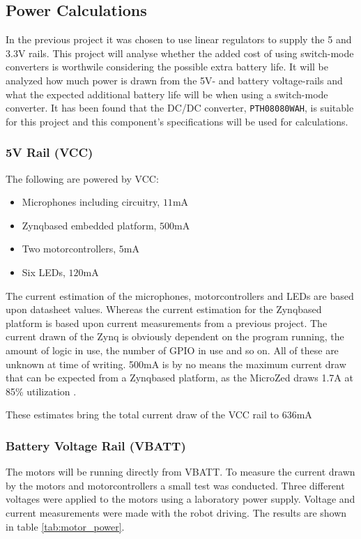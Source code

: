 \subsection{Power Calculations} %
\label{sub:power_calculations}
In the previous project it was chosen to use linear regulators to supply the 5 and 3.3V rails.
This project will analyse whether the added cost of using switch-mode converters is worthwile considering the possible extra battery life.
It will be analyzed how much power is drawn from the 5V- and battery voltage-rails and what the expected additional battery life will be when using a switch-mode converter.
It has been found that the DC/DC converter, \texttt{PTH08080WAH}, is suitable for this project and this component's specifications will be used for calculations. 

\subsubsection*{5V Rail (VCC)} %

The following are powered by VCC:
\begin{itemize}
	\item Microphones including circuitry, $11$mA
	\item Zynqbased embedded platform, $500$mA
	\item Two motorcontrollers, $5$mA
	\item Six LEDs, $120$mA
\end{itemize}
The current estimation of the microphones, motorcontrollers and LEDs are based upon datasheet values. 
Whereas the current estimation for the Zynqbased platform is based upon current measurements from a previous project.
The current drawn of the Zynq is obviously dependent on the program running, the amount of logic in use, the number of GPIO in use and so on. All of these are unknown at time of writing.
500mA is by no means the maximum current draw that can be expected from a Zynqbased platform, as the MicroZed draws 1.7A at 85\% utilization \cite{microzed_hardware_guide}.

These estimates bring the total current draw of the VCC rail to $636$mA

\subsubsection*{Battery Voltage Rail (VBATT)} %

The motors will be running directly from VBATT.
To measure the current drawn by the motors and motorcontrollers a small test was conducted.
Three different voltages were applied to the motors using a laboratory power supply. 
Voltage and current measurements were made with the robot driving. 
The results are shown in table \ref{tab:motor_power}.

